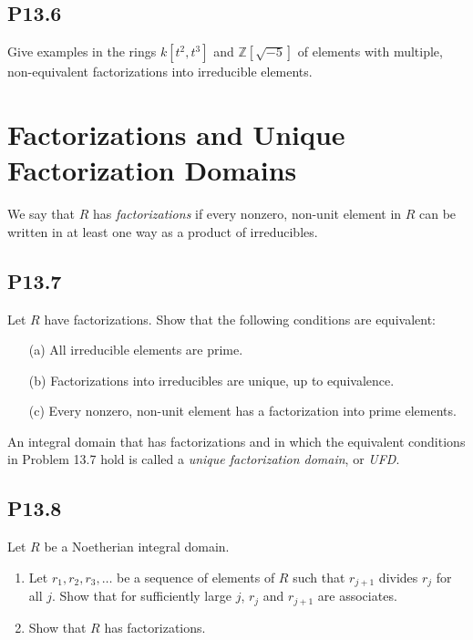 \documentclass[lang=cn,11pt]{template}
\begin{document}
\subsection*{P13.6} Give examples in the rings \( k[t^2, t^3] \) and \( \mathbb{Z}[\sqrt{-5}] \) of elements with multiple, non-equivalent factorizations into irreducible elements.

\section{Factorizations and Unique Factorization Domains}

\begin{definition}
We say that \( R \) has \textit{factorizations} if every nonzero, non-unit element in \( R \) can be written in at least one way as a product of irreducibles.
\end{definition}

\subsection*{P13.7} Let \( R \) have factorizations. Show that the following conditions are equivalent:
\begin{itemize}
    \item[(a)] All irreducible elements are prime.
    \item[(b)] Factorizations into irreducibles are unique, up to equivalence.
    \item[(c)] Every nonzero, non-unit element has a factorization into prime elements.
\end{itemize}

\begin{definition}
An integral domain that has factorizations and in which the equivalent conditions in Problem 13.7 hold is called a \textit{unique factorization domain}, or \textit{UFD}.
\end{definition}

\subsection*{P13.8} Let \( R \) be a Noetherian integral domain.
\begin{enumerate}
    \item Let \( r_1, r_2, r_3, \dots \) be a sequence of elements of \( R \) such that \( r_{j+1} \) divides \( r_j \) for all \( j \). Show that for sufficiently large \( j \), \( r_j \) and \( r_{j+1} \) are associates.
    \item Show that \( R \) has factorizations.
\end{enumerate}
\end{document}
